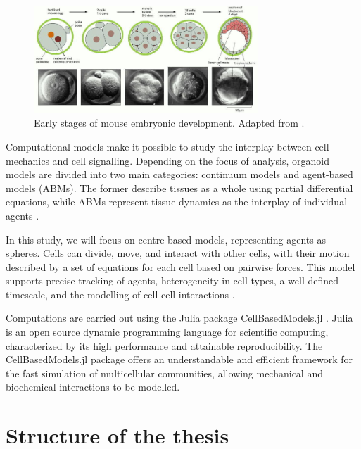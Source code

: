 \begin{figure}[h]
    \centering
    \includegraphics[width=0.75\textwidth]{figures/picture-embryogenesis.jpg}
    \caption{Early stages of mouse embryonic development. Adapted from \cite{Alberts_2002}.}
    \label{fig:pic-embryonic-development}
\end{figure}

Computational models make it possible to study the interplay between cell mechanics and cell signalling. Depending on the focus of analysis, organoid mo\-dels are divided into two main categories: continuum models and agent-based models (ABMs). The former describe tissues as a whole using partial differential equations, while ABMs represent tissue dynamics as the interplay of individual agents \parencite{Liedekerke_2015}.

In this study, we will focus on centre-based models, representing agents as spheres. Cells can divide, move, and interact with other cells, with their motion described by a set of equations for each cell based on pairwise forces. This model supports precise tracking of agents, heterogeneity in cell types, a well-defined timescale, and the modelling of cell-cell interactions \parencite{Liedekerke_2015,Gritti_2021}.

Computations are carried out using the Julia \parencite{Julia_2017} package CellBasedModels.jl \parencite{Torregrosa_2025}. Julia is an open \linebreak source dynamic programming language for scientific computing, characterized by its high performance and attainable reproducibility. The CellBasedModels.jl package offers an understandable and efficient framework for the fast simulation of multicellular communities, allowing mechanical and biochemical interactions to be modelled.



\section{Structure of the thesis}

